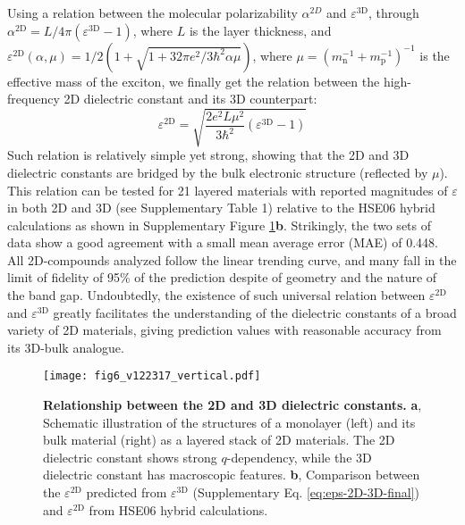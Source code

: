 \documentclass[journal=ancac3,manuscript=article,email=true,hyperref=true,keywords=true]{achemso}
\begin{document}
Using a relation between the molecular polarizability \(\alpha\)$^{2D}$ and \(\varepsilon^{\mathrm{3D}}\), through
 \(\alpha^{\mathrm{2D}}= L/4\pi (\varepsilon^{\mathrm{3D}} - 1)\)\cite{Cudazzo_2010_screen2D}, where $L$ is the layer thickness, and 
$\varepsilon^{\mathrm{2D}}(\alpha, \mu) = 1/2 (1 + \sqrt{1 + 32\pi e^2/3\hbar^2 \alpha \mu})$\cite{Olsen_2016_hydrogen}, 
where \(\mu=(m_{\mathrm{n}}^{-1} + m_{\mathrm{p}}^{-1})^{-1}\) is the
effective mass of the exciton, we finally get the relation between the high-frequency 2D dielectric constant and its 3D counterpart:
%
\begin{equation}
\label{eq:eps-2D-3D-final}
\varepsilon^{\mathrm{2D}} = \sqrt{\frac{2 e^2 L \mu^{2}}{3\hbar^{2}} (\varepsilon^{\mathrm{3D}} - 1)} %
\end{equation}
%
Such relation is relatively simple yet strong, showing that the 2D and
3D dielectric constants are bridged by the bulk electronic structure 
(reflected by \(\mu\)). This relation can be tested for 21 layered materials with reported
magnitudes of \(\varepsilon\) in both 2D and 3D (see Supplementary Table 1) relative to the 
HSE06 hybrid calculations as shown in Supplementary Figure \ref{fig-6}{\bf b}. 
Strikingly, the two sets of data show
a good agreement with a small mean average error (MAE) of
0.448. All 2D-compounds analyzed follow the linear trending curve, 
and many fall in the limit of fidelity of 95\% of the prediction 
despite of geometry and the nature of the band gap. Undoubtedly, 
the existence of such universal relation between
\(\varepsilon^{\mathrm{2D}}\) and \(\varepsilon^{\mathrm{3D}}\) greatly
facilitates the understanding of the dielectric constants of a broad variety of 2D
materials, giving prediction values with reasonable accuracy from its 3D-bulk analogue.

\begin{figure}[htbp]
\centering
\texttt{[image: fig6\_v122317\_vertical.pdf]}
\caption{\label{fig-6}
{\bf Relationship between the 2D and 3D dielectric constants.} {\bf a}, Schematic illustration of the structures of a monolayer (left) and its bulk material (right) as a layered stack of 2D materials. The 2D dielectric constant shows strong \(q\)-dependency, while the 3D dielectric constant has macroscopic features. 
{\bf b}, Comparison between the \(\varepsilon^{\mathrm{2D}}\) predicted 
from \(\varepsilon^{\mathrm{3D}}\) (Supplementary Eq. \ref{eq:eps-2D-3D-final}) 
and \(\varepsilon^{\mathrm{2D}}\) from HSE06 hybrid calculations. 
}
\end{figure}
\end{document}
